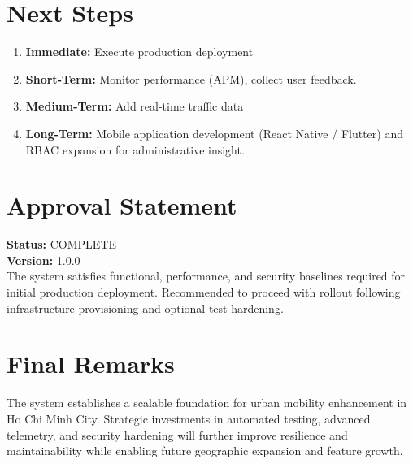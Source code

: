 \section{Next Steps}
\begin{enumerate}
    \item \textbf{Immediate:} Execute production deployment %
    \item \textbf{Short-Term:} Monitor performance (APM), collect user feedback.
    \item \textbf{Medium-Term:} Add real-time traffic data
    \item \textbf{Long-Term:} Mobile application development (React Native / Flutter) and RBAC expansion for administrative insight.
\end{enumerate}

\section{Approval Statement}
\begin{tcolorbox}[colback=green!10,colframe=black!40,arc=1mm,title=Production Deployment Recommendation]
\textbf{Status:} COMPLETE\\
\textbf{Version:} 1.0.0\\
The system satisfies functional, performance, and security baselines required for initial production deployment. Recommended to proceed with rollout following infrastructure provisioning and optional test hardening.
\end{tcolorbox}

\section{Final Remarks}
The system establishes a scalable foundation for urban mobility enhancement in Ho Chi Minh City. Strategic investments in automated testing, advanced telemetry, and security hardening will further improve resilience and maintainability while enabling future geographic expansion and feature growth.

